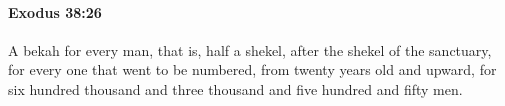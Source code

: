 
		\paragraph{Exodus 38:26} %
			\label{EXODUS-38-26}

			A bekah for every man, that is, half a shekel, after the shekel of the sanctuary, for every one that went to be numbered, from twenty years old and upward, for six hundred thousand and three thousand and five hundred and fifty men.


